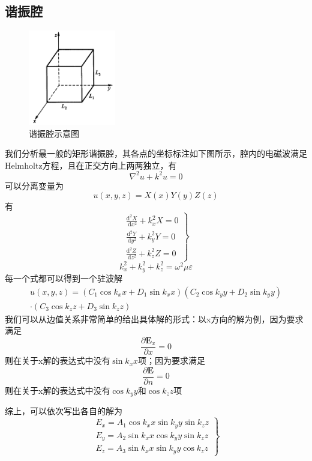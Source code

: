     \subsection{谐振腔}
        \begin{figure}%
        \centering
        \includegraphics[width=0.34\textwidth]{figs/谐振腔示意图.jpg}
        \caption*{\footnotesize 谐振腔示意图}
        \end{figure}
        我们分析最一般的矩形谐振腔，其各点的坐标标注如下图所示，腔内的电磁波满足Helmholtz方程，且在正交方向上两两独立，有\[\nabla^2 u + k^2 u =0\]可以分离变量为\[u(x,y,z)=X(x)Y(y)Z(z)\]有
            \begin{equation}
                \left.\begin{array}{l}
                \frac{\mathrm{d}^{2} X}{\mathrm{~d} x^{2}}+k_{x}^{2} X=0 \\
                \frac{\mathrm{d}^{2} Y}{\mathrm{~d} y^{2}}+k_{y}^{2} Y=0 \\
                \frac{\mathrm{d}^{2} Z}{\mathrm{~d} z^{2}}+k_{z}^{2} Z=0
                \end{array}\right\}
            \end{equation}
            \begin{equation}
                k_{x}^{2}+k_{y}^{2}+k_{z}^{2}=\omega^{2} \mu \varepsilon
            \end{equation}
        每一个式都可以得到一个驻波解\[\begin{gathered}
            u(x, y, z)=\left(C_{1} \cos k_{x} x+D_{1} \sin k_{x} x\right)\left(C_{2} \cos k_{y} y+D_{2} \sin k_{y} y\right) \\
            \cdot\left(C_{3} \cos k_{z} z+D_{3} \sin k_{z} z\right)
            \end{gathered}\]我们可以从边值关系非常简单的给出具体解的形式：以x方向的解为例，因为要求满足\[ \frac{\partial \boldsymbol{E}_x}{\partial x}=0\]则在关于x解的表达式中没有$\sin k_x x$项；因为要求满足\[ \frac{\partial \boldsymbol{E}}{\partial n}=0\]则在关于x解的表达式中没有$\cos k_y y$和$\cos k_z z$项
        
        综上，可以依次写出各自的解为
        \begin{equation}
            \left.\begin{array}{l}
            E_{x}=A_{1} \cos k_{x} x \sin k_{y} y \sin k_{z} z \\
            E_{y}=A_{2} \sin k_{x} x \cos k_{y} y \sin k_{z} z \\
            E_{z}=A_{3} \sin k_{x} x \sin k_{y} y \cos k_{z} z
            \end{array}\right\}
            \end{equation}
            
            
   